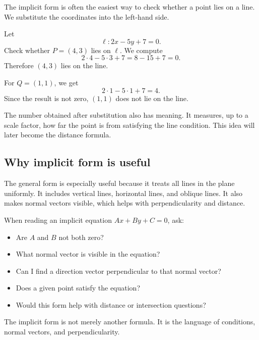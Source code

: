 The implicit form is often the easiest way to check whether a point lies on a line. We substitute the coordinates into the left-hand side.

\begin{examplebox}
Let
\[
\ell: 2x-5y+7=0.
\]
Check whether \(P=(4,3)\) lies on \(\ell\). We compute
\[
2\cdot4-5\cdot3+7=8-15+7=0.
\]
Therefore \((4,3)\) lies on the line.

For \(Q=(1,1)\), we get
\[
2\cdot1-5\cdot1+7=4.
\]
Since the result is not zero, \((1,1)\) does not lie on the line.
\end{examplebox}

The number obtained after substitution also has meaning. It measures, up to a scale factor, how far the point is from satisfying the line condition. This idea will later become the distance formula.

\subsection*{Why implicit form is useful}

The general form is especially useful because it treats all lines in the plane uniformly. It includes vertical lines, horizontal lines, and oblique lines. It also makes normal vectors visible, which helps with perpendicularity and distance.

\begin{summarybox}
When reading an implicit equation \(Ax+By+C=0\), ask:
\begin{itemize}
\item Are \(A\) and \(B\) not both zero?
\item What normal vector is visible in the equation?
\item Can I find a direction vector perpendicular to that normal vector?
\item Does a given point satisfy the equation?
\item Would this form help with distance or intersection questions?
\end{itemize}
\end{summarybox}

The implicit form is not merely another formula. It is the language of conditions, normal vectors, and perpendicularity.